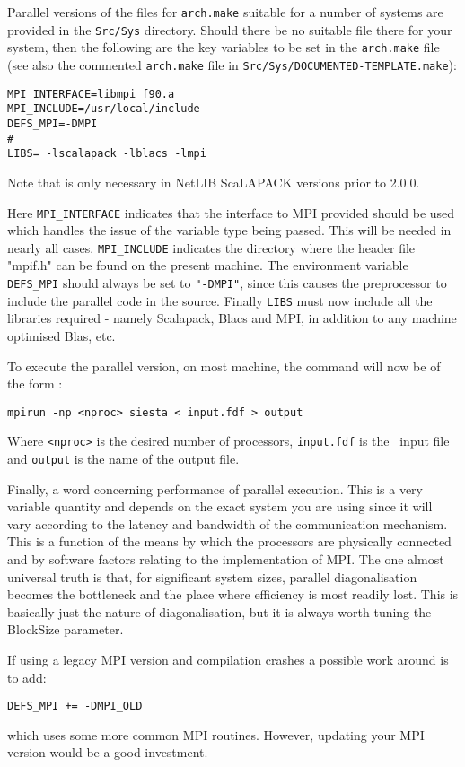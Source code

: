 \noindent
Parallel versions of the files for \texttt{arch.make} suitable for a
number of systems are provided in the \texttt{Src/Sys} directory. Should
there be no suitable file there for your system, then the following
are the key variables to be set in the \texttt{arch.make} file (see also
the commented \texttt{arch.make} file in \texttt{Src/Sys/DOCUMENTED-TEMPLATE.make}):

\begin{verbatim}
MPI_INTERFACE=libmpi_f90.a
MPI_INCLUDE=/usr/local/include
DEFS_MPI=-DMPI
#
LIBS= -lscalapack -lblacs -lmpi
\end{verbatim}
Note that  is only necessary in NetLIB ScaLAPACK
versions prior to 2.0.0.

Here \texttt{MPI\_INTERFACE} indicates that the interface to MPI provided
should be used which handles the issue of the variable type being
passed. This will be needed in nearly all cases. \texttt{MPI\_INCLUDE}
indicates the directory where the header file "mpif.h" can be found on
the present machine. The environment variable \texttt{DEFS\_MPI} should always
be set to \texttt{"-DMPI"}, since this causes the preprocessor to include the
parallel code in the source. Finally \texttt{LIBS} must now include all the
libraries required - namely Scalapack, Blacs and MPI, in addition to
any machine optimised Blas, etc.

To execute the parallel version, on most machine, the command will now
be of the form :

\texttt{mpirun -np <nproc> siesta < input.fdf > output}

Where \texttt{<nproc>} is the desired number of processors,
\texttt{input.fdf} is the \siesta\ input file and \texttt{output} is
the name of the output file.

Finally, a word concerning performance of parallel execution. This is
a very variable quantity and depends on the exact system you are using
since it will vary according to the latency and bandwidth of the
communication mechanism.  This is a function of the means by which the
processors are physically connected and by software factors relating
to the implementation of MPI. The one almost universal truth is that,
for significant system sizes, parallel diagonalisation becomes
the bottleneck and the place where efficiency is most readily
lost. This is basically just the nature of diagonalisation, but it is
always worth tuning the BlockSize parameter.

If using a legacy MPI version and compilation crashes a possible work 
around is to add:
\begin{verbatim}
DEFS_MPI += -DMPI_OLD
\end{verbatim}
which uses some more common MPI routines. However, updating your MPI
version would be a good investment.

